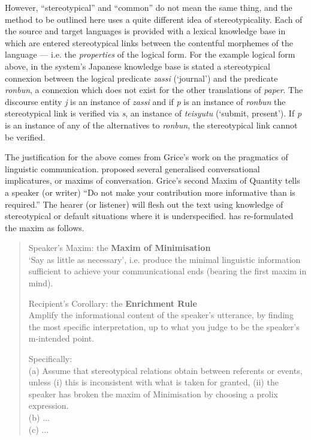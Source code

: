However, ``stereotypical'' and ``common'' do not mean the same thing,
and the method to be outlined here uses a quite different idea of
stereotypicality.
Each of the source and target languages is provided with a lexical
knowledge base in which are entered stereotypical links between the
contentful morphemes of the language
--- i.e. the
{\it properties\/}
of the logical form.
For the example logical form above,
in the system's Japanese knowledge base is stated a stereotypical
connexion between the logical predicate
{\it zassi\/}
(`journal') and the predicate
{\it ronbun},
a connexion which does not exist for the other translations of
{\it paper}.
The discourse entity
{\it j\/}
is an instance of
{\it zassi\/}
and if
{\it p\/}
is an instance of
{\it ronbun\/}
the stereotypical link is verified via
{\it s},
an instance of
{\it teisyutu}
(`submit, present'). If
{\it p\/}
is an instance of any of the alternatives to
{\it ronbun},
the stereotypical link cannot be verified.

The justification for the above comes from Grice's work on the pragmatics of
linguistic communication.
\cite{grice:75:a} proposed several generalised
conversational implicatures, or maxims of conversation.
Grice's second Maxim of Quantity tells a speaker (or writer)
``Do not make your contribution more informative than is required.''
The hearer (or listener) will flesh out the text using knowledge of
stereotypical or default situations where it is underspecified.
\cite{levinson:87:a} has re-formulated the maxim as follows.

\begin{quote}
  \setlength{\baselineskip}{12pt}
  \smallskip

  \noindent
  Speaker's Maxim: the {\bf Maxim of Minimisation}\\
  `Say as little as necessary', i.e. produce the minimal linguistic
  information sufficient to achieve your communicational ends (bearing
  the first maxim in mind).
  \smallskip

  \noindent
  Recipient's Corollary: the {\bf Enrichment Rule}\\
  Amplify the informational content of the speaker's utterance, by
  finding the most {\sc specific} interpretation, up to what you judge
  to be the speaker's m-intended point.
  \smallskip
  \smallskip

  \noindent
  Specifically:\\
  (a) Assume that stereotypical relations obtain between referents or
  events, \\
  {\sc unless} (i) this is inconsistent with what is taken for
  granted, (ii) the speaker has broken the maxim of Minimisation by
  choosing a prolix expression.\\
  (b) $\ldots$ \\
  (c) $\ldots$

  \smallskip
\end{quote}

